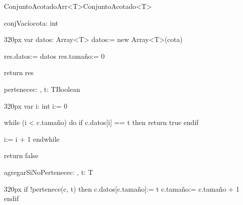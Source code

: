 \documentclass[10pt,a4paper]{article}
\begin{document}
\begin{ModuloImplements}{ConjuntoAcotadoArr<T>}{ConjuntoAcotado<T>}
  \begin{Vars}
  \end{Vars}

  \vspace{1em}
  \begin{proc}{conjVacío}{\In cota: int}{}
    \begin{ImplementationCode}{320px}
      var datos: Array<T>
          datos:= new Array<T>(cota)
      
      res.datos:= datos
      res.tamaño:= 0

      return res
    \end{ImplementationCode}
  \end{proc}
  \begin{proc}{pertenece}{\In c: , \In t: T}{Boolean}
    \begin{ImplementationCode}{320px}
      var i: int
          i:= 0
      
      while (i < c.tamaño) do
        if c.datos[i] == t then
          return true
        endif

        i:= i + 1
      endwhile

      return false
    \end{ImplementationCode}
  \end{proc}
  \begin{proc}{agregarSiNoPertenece}{\Inout c: , \In t: T}{}
    \begin{ImplementationCode}{320px}
      if !pertenece(c, t) then
        c.datos[c.tamaño]:= t
        c.tamaño:= c.tamaño + 1
      endif
      

\end{ImplementationCode}
\end{proc}
\end{ModuloImplements}
\end{document}
